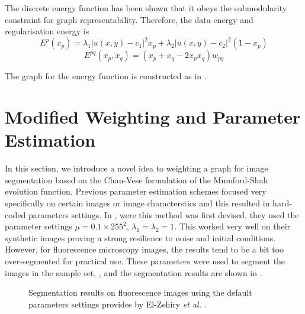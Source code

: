 \begin{definition} The discrete energy function  has been shown that it obeys the submodularity constraint for graph representability. Therefore, the data energy and regularisation energy is
	\begin{equation}
		E^p(x_p) = \lambda_1 |u(x,y)-c_1|^2 x_p + \lambda_2 |u(x,y)-c_2|^2 (1-x_p)
	\end{equation}
	\begin{equation}
	E^{pq}(x_p,x_q) = (x_p + x_q - 2x_px_q)w_{pq}
	\end{equation}
\end{definition}
The graph for the energy function is constructed as in \citep{Kolmogorov2004}.

\section{Modified Weighting and Parameter Estimation}
\label{sec:cvgc_weightingandparameterestimation}

In this section, we introduce a novel idea to weighting  a graph for image segmentation based on the Chan-Vese formulation of the Mumford-Shah evolution function. Previous parameter estimation schemes focused very specifically on certain images or image characterstics and this resulted in hard-coded parameters settings. In \citep{ElZehiry2007}, were this method was first devised, they used the parameter settings $\mu = 0.1 \times 255^2$, $\lambda_1 = \lambda_2 = 1$. This worked very well on their synthetic images proving a strong resilience to noise and initial conditions. However, for fluorescence microscopy images, the results tend to be a bit too over-segmented for practical use. These parameters were used to segment the images in the sample set, , and the segmentation results are shown in .

\begin{figure}[!h]
	\centering
	\caption{Segmentation results on fluorescence images using the default parameters settings provides by El-Zehiry \textit{et al.} \citep{ElZehiry2007}.}
	\label{fig:samplesetdefaultcv}
\end{figure}

